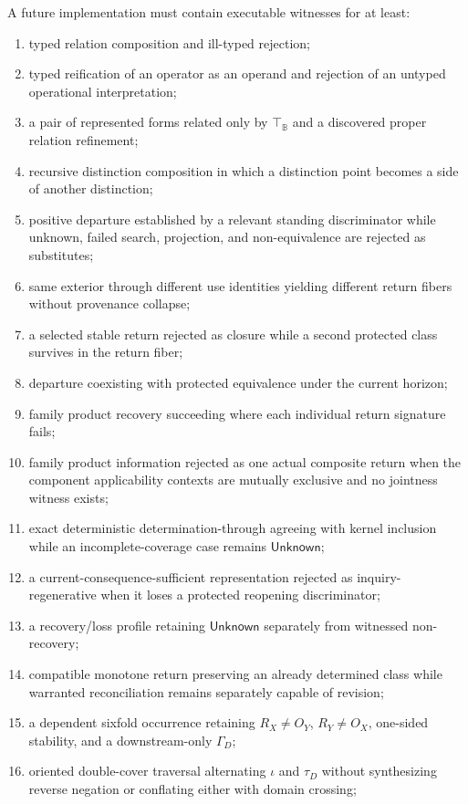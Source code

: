 \documentclass[11pt,oneside]{article}
\newcommand{\B}{\mathbb B}
\begin{document}
A future implementation must contain executable witnesses for at least:
\begin{enumerate}
\item typed relation composition and ill-typed rejection;
\item typed reification of an operator as an operand and rejection of an untyped operational interpretation;
\item a pair of represented forms related only by \(\top_{\B}\) and a discovered proper relation refinement;
\item recursive distinction composition in which a distinction point becomes a side of another distinction;
\item positive departure established by a relevant standing discriminator while unknown, failed search, projection, and non-equivalence are rejected as substitutes;
\item same exterior through different use identities yielding different return fibers without provenance collapse;
\item a selected stable return rejected as closure while a second protected class survives in the return fiber;
\item departure coexisting with protected equivalence under the current horizon;
\item family product recovery succeeding where each individual return signature fails;
\item family product information rejected as one actual composite return when the
component applicability contexts are mutually exclusive and no jointness witness exists;
\item exact deterministic determination-through agreeing with kernel inclusion while
an incomplete-coverage case remains \(\mathsf{Unknown}\);
\item a current-consequence-sufficient representation rejected as inquiry-regenerative
when it loses a protected reopening discriminator;
\item a recovery/loss profile retaining \(\mathsf{Unknown}\) separately from witnessed
non-recovery;
\item compatible monotone return preserving an already determined class while warranted reconciliation remains separately capable of revision;
\item a dependent sixfold occurrence retaining \(R_X\neq O_Y\), \(R_Y\neq O_X\), one-sided stability, and a downstream-only \(\Gamma_D\);
\item oriented double-cover traversal alternating \(\iota\) and \(\tau_D\) without synthesizing reverse negation or conflating either with domain crossing;

\end{enumerate}
\end{document}
